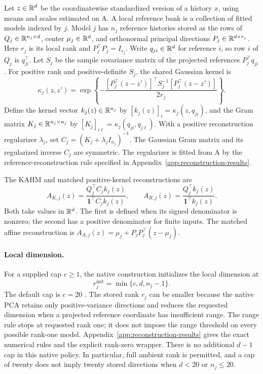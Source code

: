 Let $z\in\mathbb{R}^d$ be the coordinatewise standardized version of a history
$x$, using means and scales estimated on A. A local reference bank is a collection of fitted models indexed by
$j$. Model $j$ has $n_j$ reference histories stored as the rows of
$Q_j\in\mathbb{R}^{n_j\times d}$, center $\mu_j\in\mathbb{R}^d$, and orthonormal
principal directions $P_j\in\mathbb{R}^{d\times r_j}$. Here $r_j$ is its local
rank and $P_j^\top P_j=I_{r_j}$. Write $q_{ji}\in\mathbb{R}^d$ for reference
$i$, so row $i$ of $Q_j$ is $q_{ji}^\top$. Let $S_j$ be the sample
covariance matrix of the projected references $P_j^\top q_{ji}$. For
positive rank and positive-definite $S_j$, the shared Gaussian kernel is
\[
 \kappa_j(z,z')=\exp\!\left\{
 -\frac{[P_j^\top(z-z')]^\top S_j^{-1}[P_j^\top(z-z')]}{2r_j}
 \right\}.
\]
Define the kernel vector $k_j(z)\in\mathbb{R}^{n_j}$ by
$[k_j(z)]_i=\kappa_j(z,q_{ji})$, and the Gram matrix
$K_j\in\mathbb{R}^{n_j\times n_j}$ by
$[K_j]_{i\ell}=\kappa_j(q_{ji},q_{j\ell})$.
With a positive reconstruction regularizer $\lambda_j$, set
$C_j=(K_j+\lambda_j I_{n_j})^{-1}$. The Gaussian Gram matrix and its
regularized inverse $C_j$ are symmetric. The regularizer is fitted from A
by the reference-reconstruction rule specified in
Appendix~\ref{app:reconstruction-results}.

The KAHM and matched positive-kernel reconstructions are
\begin{equation}
 A_{K,j}(z)=\frac{Q_j^\top C_j k_j(z)}
 {\mathbf1^\top C_j k_j(z)},\qquad
 A_{R,j}(z)=\frac{Q_j^\top k_j(z)}{\mathbf1^\top k_j(z)}.
 \label{eq:mechanism-main-maps}
\end{equation}
Both take values in $\mathbb{R}^d$. The first is defined when its signed
denominator is nonzero; the second has a positive denominator for finite
inputs. The matched affine reconstruction is
$A_{A,j}(z)=\mu_j+P_jP_j^\top(z-\mu_j)$.

\paragraph{Local dimension.}
For a supplied cap $c\geq1$, the native construction initializes the local
dimension at
\[
 r_j^{\mathrm{init}}=\min\{c,d,n_j-1\}.
\]
The default cap is $c=20$ \citep[Appendix B]{Kumar2025Collaborative}.
The stored rank $r_j$ can be smaller because the native PCA retains only
positive-variance directions and reduces the requested dimension when a
projected reference coordinate has insufficient range. The range rule
stops at requested rank one; it does not impose the range threshold on
every possible rank-one model. Appendix~\ref{app:reconstruction-results}
gives the exact numerical rules and the explicit rank-zero wrapper.
There is no additional $d-1$ cap in this native policy. In particular,
full ambient rank is permitted, and a cap of twenty does not imply twenty
stored directions when $d<20$ or $n_j\leq20$.

